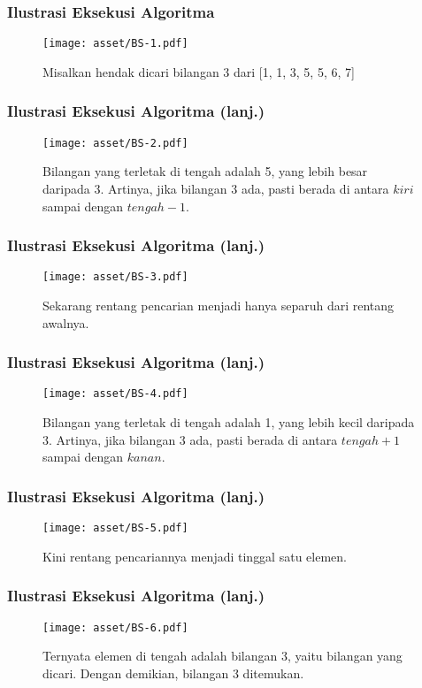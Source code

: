 \begin{frame}
\frametitle{Ilustrasi Eksekusi Algoritma}
  \begin{figure}
    \vspace*{-0.32cm}
    \texttt{[image: asset/BS-1.pdf]}
    \caption{Misalkan hendak dicari bilangan 3 dari [1, 1, 3, 5, 5, 6, 7]}
  \end{figure}
\end{frame}

\begin{frame}
\frametitle{Ilustrasi Eksekusi Algoritma (lanj.)}
  \begin{figure}
    \texttt{[image: asset/BS-2.pdf]}
    \caption{Bilangan yang terletak di tengah adalah 5, yang lebih besar daripada 3. Artinya, jika bilangan 3 ada, pasti berada di antara $kiri$ sampai dengan $tengah-1$.}
  \end{figure}
\end{frame}

\begin{frame}
\frametitle{Ilustrasi Eksekusi Algoritma (lanj.)}
  \begin{figure}
    \vspace*{-0.32cm}
    \texttt{[image: asset/BS-3.pdf]}
    \caption{Sekarang rentang pencarian menjadi hanya separuh dari rentang awalnya.}
  \end{figure}
\end{frame}


\begin{frame}
\frametitle{Ilustrasi Eksekusi Algoritma (lanj.)}
  \begin{figure}
    \texttt{[image: asset/BS-4.pdf]}
    \caption{Bilangan yang terletak di tengah adalah 1, yang lebih kecil daripada 3. Artinya, jika bilangan 3 ada, pasti berada di antara $tengah+1$ sampai dengan $kanan$.}
  \end{figure}
\end{frame}


\begin{frame}
\frametitle{Ilustrasi Eksekusi Algoritma (lanj.)}
  \begin{figure}
    \vspace*{-0.32cm}
    \texttt{[image: asset/BS-5.pdf]}
    \caption{Kini rentang pencariannya menjadi tinggal satu elemen.}
  \end{figure}
\end{frame}


\begin{frame}
\frametitle{Ilustrasi Eksekusi Algoritma (lanj.)}
  \begin{figure}
    \texttt{[image: asset/BS-6.pdf]}
    \caption{Ternyata elemen di tengah adalah bilangan 3, yaitu bilangan yang dicari. Dengan demikian, bilangan 3 ditemukan.}
  \end{figure}
\end{frame}


